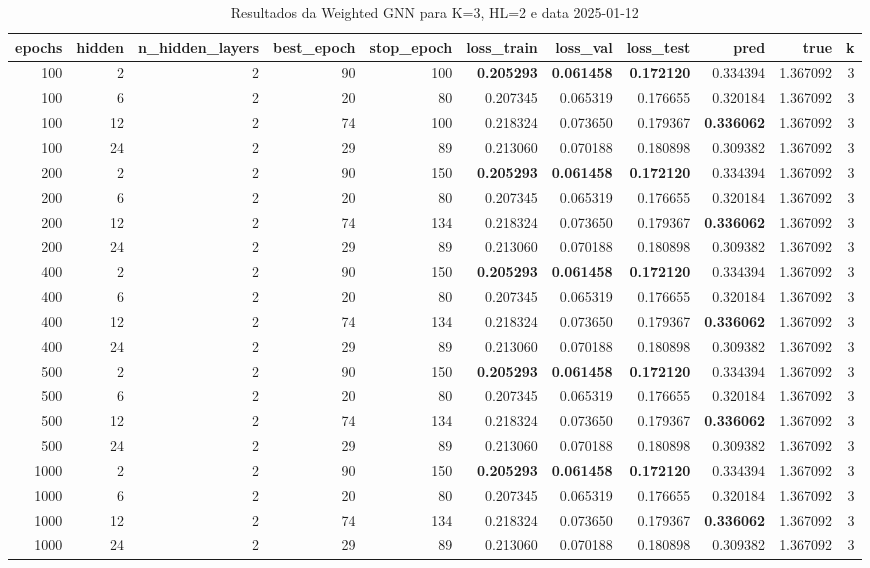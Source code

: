 \begin{table}
\caption{Resultados da Weighted GNN para K=3, HL=2 e data 2025-01-12}
\label{tab:weighted_gnn_results_k3_hl2_d20250112}
\begin{tabular}{rrrrrrrrrrr}
\toprule
epochs & hidden & n\_hidden\_layers & best\_epoch & stop\_epoch & loss\_train & loss\_val & loss\_test & pred & true & k \\
\midrule
100 & 2 & 2 & 90 & 100 & \textbf{0.205293} & \textbf{0.061458} & \textbf{0.172120} & 0.334394 & 1.367092 & 3 \\
100 & 6 & 2 & 20 & 80 & 0.207345 & 0.065319 & 0.176655 & 0.320184 & 1.367092 & 3 \\
100 & 12 & 2 & 74 & 100 & 0.218324 & 0.073650 & 0.179367 & \textbf{0.336062} & 1.367092 & 3 \\
100 & 24 & 2 & 29 & 89 & 0.213060 & 0.070188 & 0.180898 & 0.309382 & 1.367092 & 3 \\
200 & 2 & 2 & 90 & 150 & \textbf{0.205293} & \textbf{0.061458} & \textbf{0.172120} & 0.334394 & 1.367092 & 3 \\
200 & 6 & 2 & 20 & 80 & 0.207345 & 0.065319 & 0.176655 & 0.320184 & 1.367092 & 3 \\
200 & 12 & 2 & 74 & 134 & 0.218324 & 0.073650 & 0.179367 & \textbf{0.336062} & 1.367092 & 3 \\
200 & 24 & 2 & 29 & 89 & 0.213060 & 0.070188 & 0.180898 & 0.309382 & 1.367092 & 3 \\
400 & 2 & 2 & 90 & 150 & \textbf{0.205293} & \textbf{0.061458} & \textbf{0.172120} & 0.334394 & 1.367092 & 3 \\
400 & 6 & 2 & 20 & 80 & 0.207345 & 0.065319 & 0.176655 & 0.320184 & 1.367092 & 3 \\
400 & 12 & 2 & 74 & 134 & 0.218324 & 0.073650 & 0.179367 & \textbf{0.336062} & 1.367092 & 3 \\
400 & 24 & 2 & 29 & 89 & 0.213060 & 0.070188 & 0.180898 & 0.309382 & 1.367092 & 3 \\
500 & 2 & 2 & 90 & 150 & \textbf{0.205293} & \textbf{0.061458} & \textbf{0.172120} & 0.334394 & 1.367092 & 3 \\
500 & 6 & 2 & 20 & 80 & 0.207345 & 0.065319 & 0.176655 & 0.320184 & 1.367092 & 3 \\
500 & 12 & 2 & 74 & 134 & 0.218324 & 0.073650 & 0.179367 & \textbf{0.336062} & 1.367092 & 3 \\
500 & 24 & 2 & 29 & 89 & 0.213060 & 0.070188 & 0.180898 & 0.309382 & 1.367092 & 3 \\
1000 & 2 & 2 & 90 & 150 & \textbf{0.205293} & \textbf{0.061458} & \textbf{0.172120} & 0.334394 & 1.367092 & 3 \\
1000 & 6 & 2 & 20 & 80 & 0.207345 & 0.065319 & 0.176655 & 0.320184 & 1.367092 & 3 \\
1000 & 12 & 2 & 74 & 134 & 0.218324 & 0.073650 & 0.179367 & \textbf{0.336062} & 1.367092 & 3 \\
1000 & 24 & 2 & 29 & 89 & 0.213060 & 0.070188 & 0.180898 & 0.309382 & 1.367092 & 3 \\
\bottomrule
\end{tabular}
\end{table}

